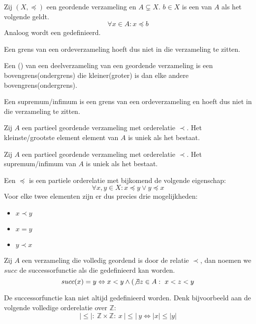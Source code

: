 \documentclass[main.tex]{subfiles}
\begin{document}
\begin{de}
  Zij $(X,\preceq)$ een geordende verzameling en $A \subsetneq X$.
  $b \in X$ is een  van $A$ als het volgende geldt.
  \[ \forall x \in A: x \preceq b \]
  Analoog wordt een  gedefinieerd.
\end{de}

\begin{opm}
  Een grens van een ordeverzameling hoeft dus niet in die verzameling te zitten.
\end{opm}

\begin{de}
  Een () van een deelverzameling van een geordende verzameling is een bovengrens(ondergrens) die kleiner(groter) is dan elke andere bovengrens(ondergrens).
\end{de}

\begin{opm}
  Een supremum/infimum is een grens van een ordeverzameling en hoeft dus niet in die verzameling te zitten.
\end{opm}

\begin{st}
  Zij $A$ een partieel geordende verzameling met orderelatie $\prec$.
  Het kleinste/grootste element element van $A$ is uniek als het bestaat.
\end{st}

\begin{st}
  Zij $A$ een partieel geordende verzameling met orderelatie $\prec$.
  Het supremum/infimum van $A$ is uniek als het bestaat.
\end{st}

\begin{de}
  Een  $\preceq$ is een partiele orderelatie met bijkomend de volgende eigenschap:
  \[ \forall x,y \in X: x \preceq y \vee y \preceq x \]
  Voor elke twee elementen zijn er dus precies drie mogelijkheden:
  \begin{itemize}
  \item $x \prec y$
  \item $x = y$
  \item $y \prec x$
  \end{itemize}
\end{de}

\begin{de}
  Zij $A$ een verzameling die volledig geordend is door de relatie $\prec$, dan noemen we $succ$ de successorfunctie als die gedefinieerd kan worden.
  \[ succ(x) = y \Leftrightarrow x < y \wedge (\not\exists z \in A:\ x < z < y \]
\end{de}

\begin{opm}
  De successorfunctie kan niet altijd gedefinieerd worden.
  Denk bijvoorbeeld aan de volgende volledige orderelatie over $\mathbb{Z}$:
  \[ |\le|:\ \mathbb{Z} \times \mathbb{Z}:\ x\ |\le|\ y \Leftrightarrow |x| \le |y| \]
\end{opm}
\end{document}
